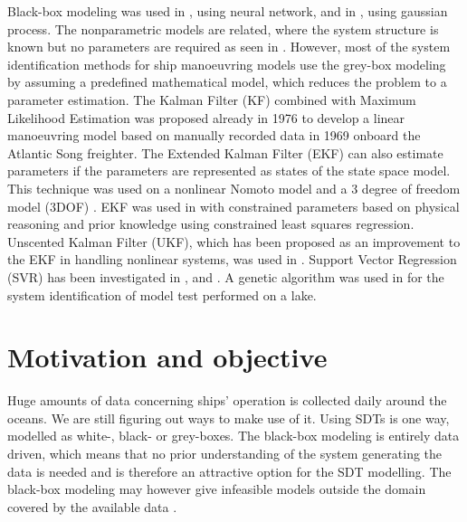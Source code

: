 Black-box modeling was used in \cite{he_nonparametric_2022}, using neural network, and in \cite{xue_identification_2021}, using gaussian process. The nonparametric models are related, where the system structure is known but no parameters are required as seen in \cite{pongduang_nonparametric_2020}. However, most of the system identification methods for ship manoeuvring models use the grey-box modeling by assuming a predefined mathematical model, which reduces the problem to a parameter estimation.
The Kalman Filter (KF) combined with Maximum Likelihood Estimation was proposed already in 1976 \cite{astrom_identification_1976} to develop a linear manoeuvring model based on manually recorded data in 1969 onboard the Atlantic Song freighter. The Extended Kalman Filter (EKF) can also estimate parameters if the parameters are represented as states of the state space model. This technique was used on a nonlinear Nomoto model \cite{perera_system_2015} and a 3 degree of freedom model (3DOF) \cite{shi_identification_2009}. EKF was used in \cite{araki_estimating_2012} with constrained parameters based on physical reasoning and prior knowledge using constrained least squares regression. Unscented Kalman Filter (UKF), which has been proposed as an improvement to the EKF in handling nonlinear systems, was used in \cite{revestido_herrero_two-step_2012}.
Support Vector Regression (SVR) has been investigated in \cite{zhu_parameter_2017}, \cite{wang_parameter_2021} and \cite{luo_parameter_2016}. A genetic algorithm was used in \cite{miller_ship_2021} for the system identification of model test performed on a lake.





\section{Motivation and objective}
\label{sec:motivation}
Huge amounts of data concerning ships' operation is collected daily around the oceans. We are still figuring out ways to make use of it. Using SDTs is one way, modelled as white-, black- or grey-boxes.
The black-box modeling is entirely data driven, which means that no prior understanding of the system generating the data is needed and is therefore an attractive option for the SDT modelling. The black-box modeling may however give infeasible models outside the domain covered by the available data \cite{nielsen_machine_2022}. 

